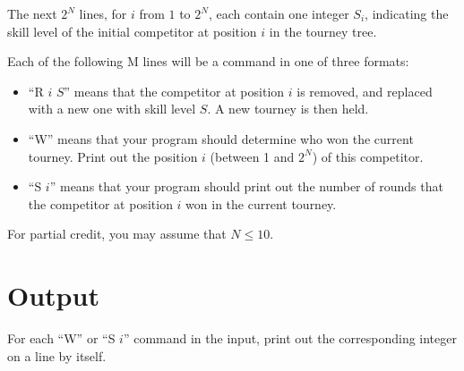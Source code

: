The next $2^N$ lines, for $i$ from $1$ to $2^N$, each contain one integer $S_i$, indicating the
skill level of the initial competitor at position $i$ in the tourney tree.

Each of the following M lines will be a command in one of three formats:
\begin{itemize}
\item ``R $i$ $S$'' means that the competitor at position $i$ is removed, and replaced with a new
one with skill level $S$. A new tourney is then held.
\item ``W'' means that your program should determine who won the current tourney. Print out the
position $i$ (between 1 and $2^N$) of this competitor.
\item “S $i$” means that your program should print out the number of rounds that the competitor at
position $i$ won in the current tourney.
\end{itemize}

For partial credit, you may assume that $N\le 10$.

\section*{Output}
For each ``W'' or ``S $i$'' command in the input, print out the corresponding integer on a line by
itself.

